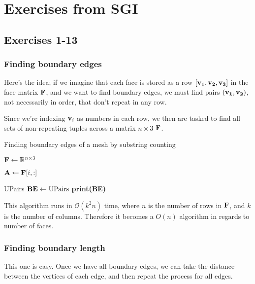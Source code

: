 \chapter{Exercises from SGI}

\section{Exercises 1-13}
\subsection{Finding boundary edges}

Here's the idea; if we imagine that each face is stored
as a row $[\bf{v_1, v_2, v_3}]$ in the face matrix
$\bf{F}$, and we want to find boundary edges, we must
find pairs $\bf{(v_1, v_2)}$, not necessarily in order,
that don't repeat in any row.

\spa

Since we're indexing $\bf{v}_i$ as numbers in each row,
we then are tasked to find all sets of non-repeating tuples
across a matrix $n \times 3$ $\bf{F}$.

\begin{algorithm}
\caption{Finding boundary edges of a mesh by substring counting}
\begin{algorithmic}[1]

\State $\bf{F} \gets \RR^{n \times 3}$
    
    \State $\bf{A} \gets \bf{F}[i,:]$
    \EndFor
    
    
\State \Return UPairs
\State $\bf{BE} \gets \text{UPairs}$
\State \textbf{print(BE)}
\EndProcedure
\end{algorithmic}
\end{algorithm}

This algorithm runs in $\mathcal{O}(k^2n)$ time, where
$n$ is the number of rows in $\bf{F}$, and $k$ is the
number of columns. Therefore it becomes a $O(n)$ algorithm
in regards to number of faces.


\subsection{Finding boundary length}

This one is easy. Once we have all boundary edges,
we can take the distance between the vertices of each edge,
and then repeat the process for all edges.

